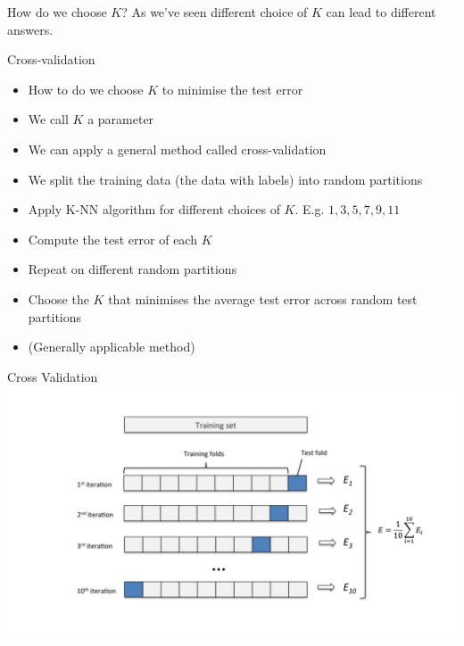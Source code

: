 \documentclass{bredelebeamer}
\begin{document}
\begin{frame}{How do we choose $K$?}
As we've seen different choice of $K$ can lead to different answers.
\begin{exampleblock}{Cross-validation}
	
	\begin{itemize}
		\item How to do we choose $K$ to minimise the test error
		\item We call $K$ a parameter
		\item We can apply a general method called cross-validation
		\item We split the training data (the data with labels) into random partitions
		\item Apply K-NN algorithm for different choices of $K$. E.g. $1,3,5,7,9,11$
		\item Compute the test error of each $K$
		\item Repeat on different random partitions
		\item Choose the $K$ that minimises the average test error across random test partitions
		\item (Generally applicable method)
	\end{itemize}
 
\end{exampleblock}

\end{frame}

\begin{frame}{Cross Validation}
\includegraphics[width = 1\textwidth]{cv}
\end{frame}
\end{document}
